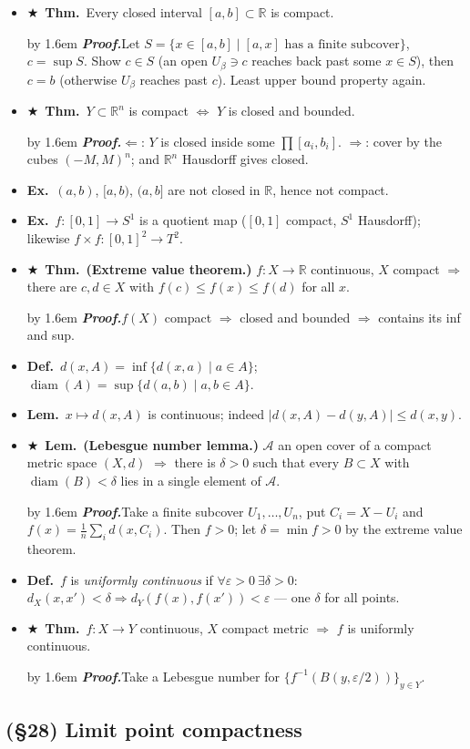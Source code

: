 \documentclass[12pt,a4paper]{article}
\newcommand{\Dfn}{\textbf{Def.}~}
\newcommand{\Thm}{\textbf{Thm.}~}
\newcommand{\Lem}{\textbf{Lem.}~}
\newcommand{\Exa}{\textbf{Ex.}~}
\newcommand{\Key}{$\bigstar$~}                  %
\newcommand{\Pf}[1]{%
  \par\addvspace{7pt}\nopagebreak
  \begingroup
    \advance\leftskip by 1.6em
    \parindent=0pt \small\color{prf}%
    \textbf{\textit{Proof.}}\enspace #1\par
  \endgroup
  \addvspace{9pt}}
\newenvironment{BL}%
  {\begin{itemize}[leftmargin=1.4em,labelsep=0.55em,itemsep=11pt,topsep=11pt,parsep=0pt]}%
  {\end{itemize}}
\newcommand{\RR}{\mathbb{R}}
\newcommand{\cA}{\mathcal{A}}
\DeclareMathOperator{\diam}{diam}
\renewcommand{\iff}{\Leftrightarrow}
\newcommand{\imp}{\Rightarrow}
\begin{document}
\begin{BL}
\item \Key\Thm Every closed interval $[a,b]\subset\RR$ is compact.
\Pf{Let $S=\{x\in[a,b]\mid[a,x]\text{ has a finite subcover}\}$, $c=\sup S$.
Show $c\in S$ (an open $U_\beta\ni c$ reaches back past some $x\in S$), then $c=b$
(otherwise $U_\beta$ reaches past $c$). Least upper bound property again.}
\item \Key\Thm $Y\subset\RR^n$ is compact $\iff$ $Y$ is closed and bounded.
\Pf{$\Leftarrow$: $Y$ is closed inside some $\prod[a_i,b_i]$.
$\imp$: cover by the cubes $(-M,M)^n$; and $\RR^n$ Hausdorff gives closed.}
\item \Exa $(a,b)$, $[a,b)$, $(a,b]$ are not closed in $\RR$, hence not compact.
\item \Exa $f\colon[0,1]\to S^1$ is a quotient map ($[0,1]$ compact, $S^1$ Hausdorff);
      likewise $f\times f\colon[0,1]^2\to T^2$.
\item \Key\Thm \textbf{(Extreme value theorem.)} $f\colon X\to\RR$ continuous, $X$ compact
      $\imp$ there are $c,d\in X$ with $f(c)\le f(x)\le f(d)$ for all $x$.
\Pf{$f(X)$ compact $\imp$ closed and bounded $\imp$ contains its inf and sup.}
\item \Dfn $d(x,A)=\inf\{d(x,a)\mid a\in A\}$;\quad $\diam(A)=\sup\{d(a,b)\mid a,b\in A\}$.
\item \Lem $x\mapsto d(x,A)$ is continuous; indeed $|d(x,A)-d(y,A)|\le d(x,y)$.
\item \Key\Lem \textbf{(Lebesgue number lemma.)} $\cA$ an open cover of a compact metric space
      $(X,d)$ $\imp$ there is $\delta>0$ such that every $B\subset X$ with
      $\diam(B)<\delta$ lies in a single element of $\cA$.
\Pf{Take a finite subcover $U_1,\dots,U_n$, put $C_i=X-U_i$ and
$f(x)=\frac1n\sum_i d(x,C_i)$. Then $f>0$; let $\delta=\min f>0$ by the extreme value theorem.}
\item \Dfn $f$ is \emph{uniformly continuous} if $\forall\varepsilon>0\ \exists\delta>0$:
      $d_X(x,x')<\delta\imp d_Y(f(x),f(x'))<\varepsilon$ --- one $\delta$ for all points.
\item \Key\Thm $f\colon X\to Y$ continuous, $X$ compact metric $\imp$ $f$ is uniformly continuous.
\Pf{Take a Lebesgue number for $\{f^{-1}(B(y,\varepsilon/2))\}_{y\in Y}$.}
\end{BL}

\subsection{(\S28) Limit point compactness}
\end{document}
